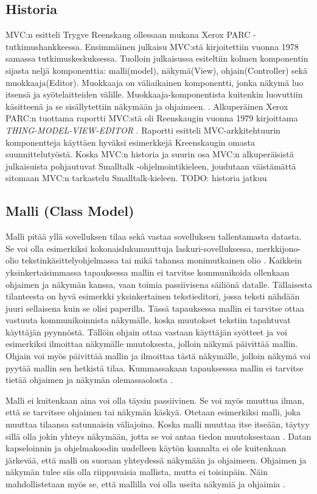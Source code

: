 \documentclass[finnish,utf8,nonumbib,palatino,kandi]{gradu2}
\begin{document}
\subsection{Historia}

MVC:n esitteli Trygve Reenskaug ollessaan mukana Xerox PARC -tutkimushankkeessa. Ensimmäinen julkaisu MVC:stä
kirjoitettiin vuonna 1978 samassa tutkimuskeskuksessa. Tuolloin julkaisussa esiteltiin kolmen komponentin sijasta neljä
komponenttia: malli(model), näkymä(View), ohjain(Controller) sekä muokkaaja(Editor). Muokkaaja on väliaikainen komponentti, jonka näkymä
luo itsensä ja syötelaitteiden välille. Muokkaaja-komponentista kuitenkin luovuttiin käsitteenä ja se sisällytettiin näkymään ja ohjaimeen. \cite{Reenskaug}.
Alkuperäinen Xerox PARC:n tuottama raportti MVC:stä oli Reenskaugin vuonna 1979 kirjoittama \emph{THING-MODEL-VIEW-EDITOR} \cite{reenskaug:1979}. Raportti 
esitteli MVC-arkkitehtuurin komponentteja käyttäen hyväksi esimerkkejä Kreenskaugin omasta suunnittelutyöstä. Koska MVC:n historia ja suurin osa MVC:n
alkuperäisistä julkaisuista pohjautuvat Smalltalk -ohjelmointikieleen, joudutaan väistämättä sitomaan MVC:n tarkastelu Smalltalk-kieleen.  TODO: historia jatkuu 

\subsection{Malli (Class Model)}
Malli pitää yllä sovelluksen tilaa sekä vastaa sovelluksen tallentamasta datasta. Se voi olla esimerkiksi kokonaislukumuuttuja laskuri-sovelluksessa, merkkijono-olio tekstinkäsittelyohjelmassa tai
mikä tahansa monimutkainen olio \cite[s. 3]{Krasner:desc}. Kaikkein yksinkertaisimmassa tapauksessa mallin ei tarvitse kommunikoida ollenkaan ohjaimen ja näkymän kanssa, vaan toimia passiivisena säiliönä datalle. 
Tällaisesta tilanteesta on hyvä esimerkki yksinkertainen tekstieditori, jossa teksti nähdään juuri sellaisena kuin se olisi paperilla. Tässä tapauksessa mallin ei tarvitse ottaa vastuuta
kommunikoinnista näkymälle, koska muutokset tekstiin tapahtuvat käyttäjän pyynnöstä. Tällöin ohjain ottaa vastaan käyttäjän syötteet ja voi esimerkiksi ilmoittaa näkymälle muutoksesta, jolloin näkymä
päivittää mallin. Ohjain voi myös päivittää mallin ja ilmoittaa tästä näkymälle, jolloin näkymä voi pyytää mallin sen hetkistä tilaa. Kummassakaan tapauksesssa mallin ei tarvitse tietää ohjaimen ja näkymän
olemassaolosta \cite{Burbeck}. 

Malli ei kuitenkaan aina voi olla täysin passiivinen. Se voi myös muuttua ilman, että se tarvitsee ohjaimen tai näkymän käskyä. Otetaan esimerkiksi malli, joka muuttaa tilaansa satunnaisin väliajoina. Koska malli muuttaa itse itseään, täytyy sillä olla jokin yhteys näkymään, jotta se voi antaa tiedon muutoksestaan \cite{Burbeck}. Datan kapseloinnin ja ohjelmakoodin uudelleen käytön kannalta ei ole kuitenkaan järkevää, että malli on suoraan yhteydessä näkymään ja ohjaimeen. Ohjaimen ja näkymän tulee siis olla riippuvaisia mallista, mutta ei toisinpäin. Näin mahdollistetaan myös se, että mallilla voi olla useita näkymiä ja ohjaimia \cite[s. 4]{Krasner:desc}.
\end{document}

